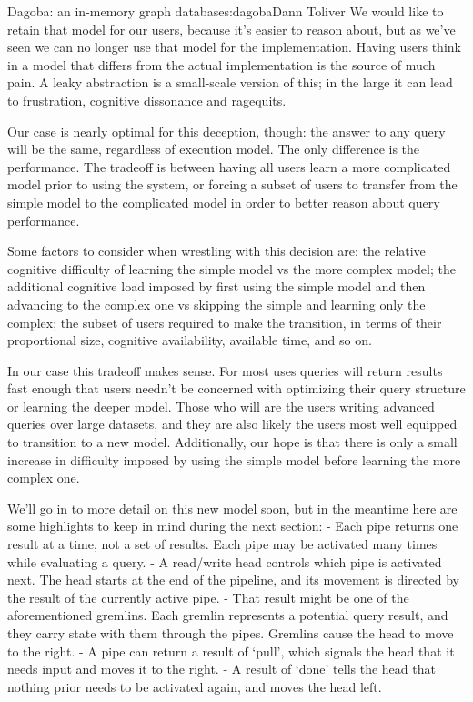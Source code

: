 \begin{aosachapter}{Dagoba: an in-memory graph database}{s:dagoba}{Dann Toliver}
We would like to retain that model for our users, because it's easier to
reason about, but as we've seen we can no longer use that model for the
implementation. Having users think in a model that differs from the
actual implementation is the source of much pain. A leaky abstraction is
a small-scale version of this; in the large it can lead to frustration,
cognitive dissonance and ragequits.

Our case is nearly optimal for this deception, though: the answer to any
query will be the same, regardless of execution model. The only
difference is the performance. The tradeoff is between having all users
learn a more complicated model prior to using the system, or forcing a
subset of users to transfer from the simple model to the complicated
model in order to better reason about query performance.

Some factors to consider when wrestling with this decision are: the
relative cognitive difficulty of learning the simple model vs the more
complex model; the additional cognitive load imposed by first using the
simple model and then advancing to the complex one vs skipping the
simple and learning only the complex; the subset of users required to
make the transition, in terms of their proportional size, cognitive
availability, available time, and so on.

In our case this tradeoff makes sense. For most uses queries will return
results fast enough that users needn't be concerned with optimizing
their query structure or learning the deeper model. Those who will are
the users writing advanced queries over large datasets, and they are
also likely the users most well equipped to transition to a new model.
Additionally, our hope is that there is only a small increase in
difficulty imposed by using the simple model before learning the more
complex one.

We'll go in to more detail on this new model soon, but in the meantime
here are some highlights to keep in mind during the next section: - Each
pipe returns one result at a time, not a set of results. Each pipe may
be activated many times while evaluating a query. - A read/write head
controls which pipe is activated next. The head starts at the end of the
pipeline, and its movement is directed by the result of the currently
active pipe. - That result might be one of the aforementioned gremlins.
Each gremlin represents a potential query result, and they carry state
with them through the pipes. Gremlins cause the head to move to the
right. - A pipe can return a result of `pull', which signals the head
that it needs input and moves it to the right. - A result of `done'
tells the head that nothing prior needs to be activated again, and moves
the head left.


\end{aosachapter}
